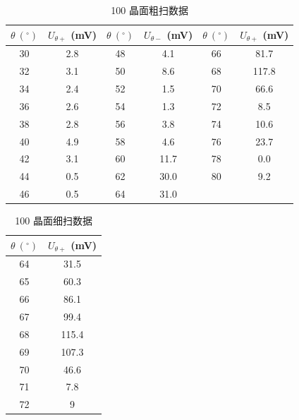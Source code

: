\documentclass[UTF8]{article}
\theoremstyle{MyLineTheoremStyle} %
\theoremstyle{MyBlockTheoremStyle} %
\theoremstyle{MySubsubsectionStyle} %
\begin{document}
\begin{center}
\noindent\begin{minipage}{0.65\columnwidth}
\begin{table}[H]\centering
    \caption{100 晶面粗扫数据}
    \label{100 晶面粗扫数据}
    \begin{tabular}{cccccc}\toprule
        $\theta \ \mathrm{(^\circ)}$ & $U_{\theta+}$ (mV) & $\theta \ \mathrm{(^\circ)}$ & $U_{\theta-}$ (mV) & $\theta \ \mathrm{(^\circ)}$ & $U_{\theta+}$ (mV) \\ 
        \midrule
        30	&2.8	&48	&4.1	&66	&81.7   \\
        32	&3.1	&50	&8.6	&68	&117.8  \\
        34	&2.4	&52	&1.5	&70	&66.6   \\
        36	&2.6	&54	&1.3	&72	&8.5    \\
        38	&2.8	&56	&3.8	&74	&10.6   \\
        40	&4.9	&58	&4.6	&76	&23.7   \\
        42	&3.1	&60	&11.7   &78	&0.0    \\
        44	&0.5	&62	&30.0   &80	&9.2    \\
        46	&0.5	&64	&31.0   &	&       \\
        \bottomrule
    \end{tabular}
\end{table}
\end{minipage}\hfill\begin{minipage}{0.32\columnwidth}
\begin{table}[H]\centering
    \caption{100 晶面细扫数据}
    \label{100 晶面细扫数据}
    \begin{tabular}{cc}\toprule
        $\theta \ \mathrm{(^\circ)}$ & $U_{\theta+}$ (mV) \\ 
        \midrule
        64&	31.5    \\
        65&	60.3    \\
        66&	86.1    \\
        67&	99.4    \\
        68&	115.4   \\
        69&	107.3   \\
        70&	46.6    \\
        71&	7.8     \\
        72&	9       \\  
        \bottomrule
    \end{tabular}
\end{table}
\end{minipage}\end{center}
\end{document}
